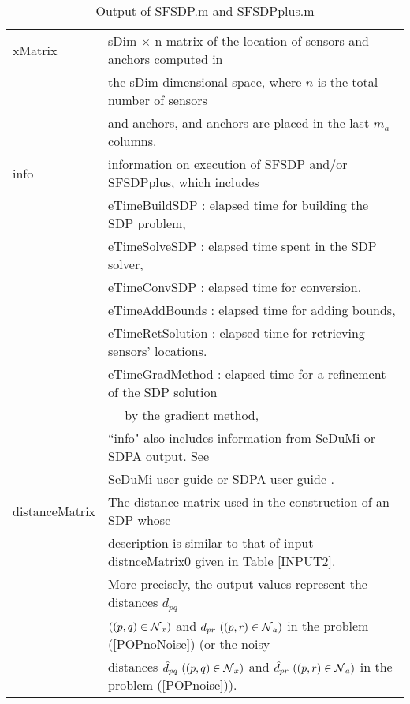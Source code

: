 \documentclass[12pt]{article}
\def\NC{\mbox{$\cal N$}}
\begin{document}
\begin{table}[hdp]
\begin{center}
\begin{tabular}{|l|l|} \hline
xMatrix   &   sDim $\times$ n matrix of the location of sensors and anchors computed  in\\
             &  the sDim dimensional space,  where $n$ is the total  number of sensors\\
               &  and anchors, and  anchors are placed  in the last $m_a$ columns.\\
 info      &  information on execution of SFSDP and/or SFSDPplus, which includes \\
&  eTimeBuildSDP : elapsed time for building the SDP problem,\\
& eTimeSolveSDP : elapsed time spent in the SDP solver,\\
& eTimeConvSDP : elapsed time for conversion,\\
& eTimeAddBounds : elapsed time for adding bounds,\\
& eTimeRetSolution : elapsed time for retrieving sensors' locations.\\
& eTimeGradMethod : elapsed time for a refinement of the SDP solution \\ 
& \mbox{ \ } \hspace{33.5mm} by the gradient method, \\
&  ``info" also includes information from SeDuMi or SDPA output. See \\ 
&  SeDuMi  user guide \cite{SEDUMI} or SDPA user guide \cite{FUJISAWA08}. \\ 
distanceMatrix & The distance matrix used in the construction of an SDP whose\\ 
& description is similar to that of input distnceMatrix0 given in Table \ref{INPUT2}.  \\ 
& More precisely, the output values represent the distances $d_{pq}$  \\
& $((p,q) \in \NC_x)$ and $d_{pr}  \ ((p,r) \in \NC_a)$ in the problem (\ref{POPnoNoise})  (or the noisy \\
& distances $\hat{d}_{pq}  \ ((p,q) \in \NC_x)$ and $\hat{d}_{pr}   \ ((p,r) \in \NC_a)$ in the problem (\ref{POPnoise})). 
\\ \hline
\end{tabular}
\caption{Output of SFSDP.m and SFSDPplus.m}
\label{OUTPUT}
\end{center}
\end{table}
\end{document}
